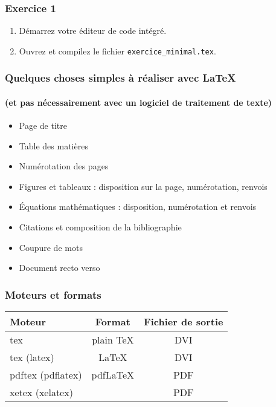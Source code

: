 
\begin{frame}[c]
	
	\frametitle{Exercice 1}
	
	\begin{enumerate}
		\item Démarrez votre éditeur de code intégré.
		\item Ouvrez et compilez le fichier \texttt{exercice\_minimal.tex}.
	\end{enumerate}

\end{frame}


\begin{frame}

	\frametitle{Quelques choses simples à réaliser avec {\LaTeX}}
	\framesubtitle{(et pas nécessairement avec un logiciel de traitement de texte)}
	
	\begin{itemize}
		\item Page de titre
		\item Table des matières
		\item Numérotation des pages
		\item Figures et tableaux : disposition sur la page, numérotation, renvois
		\item Équations mathématiques : disposition, numérotation et renvois
		\item Citations et composition de la bibliographie
		\item Coupure de mots
		\item Document recto verso
	\end{itemize}

\end{frame}


\begin{frame}[c]
	
	\frametitle{Moteurs et formats}
	
	\begin{table}
		\begin{tabular}{lcc}
			\hline\hline
			Moteur				&	Format			&	Fichier de sortie \\
			\hline
			tex					&	plain \TeX		&	DVI	\\
			tex (latex)			&	\LaTeX			&	DVI \\
			pdftex (pdflatex)	&	pdf\LaTeX		&	PDF \\
			xetex (xelatex)		&	\XeLaTeX		&	PDF \\
			\hline\hline
		\end{tabular}
	\end{table}

\end{frame}

